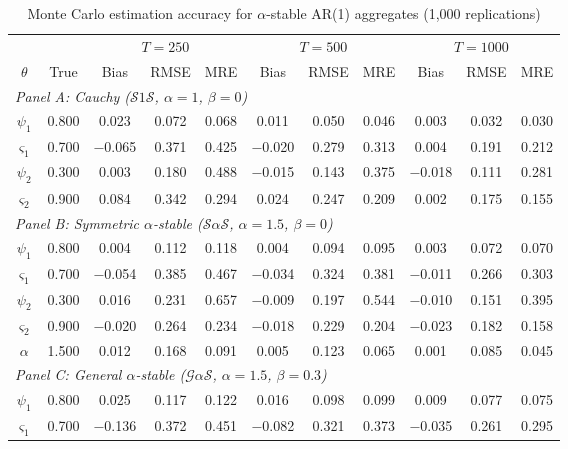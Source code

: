 \begin{table}[!h]
\centering
\caption{Monte Carlo estimation accuracy for $\alpha$-stable AR(1) aggregates (1{,}000 replications)}
\label{tab:mc_accuracy_full}
\begin{tabular}{ccccccccccc}
\toprule
& & \multicolumn{3}{c}{$T = 250$} & \multicolumn{3}{c}{$T = 500$} & \multicolumn{3}{c}{$T = 1000$} \\
\cmidrule(lr){3-5} \cmidrule(lr){6-8} \cmidrule(lr){9-11}
$\theta$ & True & Bias & RMSE & MRE & Bias & RMSE & MRE & Bias & RMSE & MRE \\
\midrule
\multicolumn{11}{l}{\textit{Panel A: Cauchy ($\mathcal{S}1\mathcal{S}$, $\alpha = 1$, $\beta = 0$)}} \\[3pt]
$\psi_1$ & 0.800 & 0.023 & 0.072 & 0.068 & 0.011 & 0.050 & 0.046 & 0.003 & 0.032 & 0.030 \\
$\varsigma_{1}$ & 0.700 & $-$0.065 & 0.371 & 0.425 & $-$0.020 & 0.279 & 0.313 & 0.004 & 0.191 & 0.212 \\
$\psi_2$ & 0.300 & 0.003 & 0.180 & 0.488 & $-$0.015 & 0.143 & 0.375 & $-$0.018 & 0.111 & 0.281 \\
$\varsigma_{2}$ & 0.900 & 0.084 & 0.342 & 0.294 & 0.024 & 0.247 & 0.209 & 0.002 & 0.175 & 0.155 \\[6pt]
\multicolumn{11}{l}{\textit{Panel B: Symmetric $\alpha$-stable ($\mathcal{S}\alpha\mathcal{S}$, $\alpha = 1.5$, $\beta = 0$)}} \\[3pt]
$\psi_1$ & 0.800 & 0.004 & 0.112 & 0.118 & 0.004 & 0.094 & 0.095 & 0.003 & 0.072 & 0.070 \\
$\varsigma_{1}$ & 0.700 & $-$0.054 & 0.385 & 0.467 & $-$0.034 & 0.324 & 0.381 & $-$0.011 & 0.266 & 0.303 \\
$\psi_2$ & 0.300 & 0.016 & 0.231 & 0.657 & $-$0.009 & 0.197 & 0.544 & $-$0.010 & 0.151 & 0.395 \\
$\varsigma_{2}$ & 0.900 & $-$0.020 & 0.264 & 0.234 & $-$0.018 & 0.229 & 0.204 & $-$0.023 & 0.182 & 0.158 \\
$\alpha$ & 1.500 & 0.012 & 0.168 & 0.091 & 0.005 & 0.123 & 0.065 & 0.001 & 0.085 & 0.045 \\[6pt]
\multicolumn{11}{l}{\textit{Panel C: General $\alpha$-stable ($\mathcal{G}\alpha\mathcal{S}$, $\alpha = 1.5$, $\beta = 0.3$)}} \\[3pt]
$\psi_1$ & 0.800 & 0.025 & 0.117 & 0.122 & 0.016 & 0.098 & 0.099 & 0.009 & 0.077 & 0.075 \\
$\varsigma_{1}$ & 0.700 & $-$0.136 & 0.372 & 0.451 & $-$0.082 & 0.321 & 0.373 & $-$0.035 & 0.261 & 0.295 \\

\end{tabular}
\end{table}
